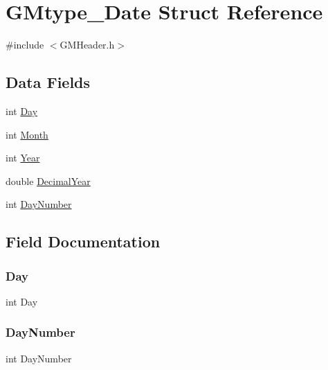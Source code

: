 \hypertarget{struct_g_mtype___date}{}\section{G\+Mtype\+\_\+\+Date Struct Reference}
\label{struct_g_mtype___date}


{\ttfamily \#include $<$G\+M\+Header.\+h$>$}

\subsection*{Data Fields}
\begin{DoxyCompactItemize}
\item 
int \mbox{\hyperlink{struct_g_mtype___date_a8f67164de537e3ec2b47e3204ddd3400}{Day}}
\item 
int \mbox{\hyperlink{struct_g_mtype___date_a530b376ec91a278ac98531d3ea17f148}{Month}}
\item 
int \mbox{\hyperlink{struct_g_mtype___date_a42e645110404fbf4f10235789577fa32}{Year}}
\item 
double \mbox{\hyperlink{struct_g_mtype___date_afb8201d541b7b916e28bdf9884f6c794}{Decimal\+Year}}
\item 
int \mbox{\hyperlink{struct_g_mtype___date_a5f6dc4b06442462a807a1069a8c82b6d}{Day\+Number}}
\end{DoxyCompactItemize}


\subsection{Field Documentation}
\mbox{\label{struct_g_mtype___date_a8f67164de537e3ec2b47e3204ddd3400}} 
\subsubsection{\texorpdfstring{Day}{Day}}
{\footnotesize\ttfamily int Day}

\mbox{\label{struct_g_mtype___date_a5f6dc4b06442462a807a1069a8c82b6d}} 
\subsubsection{\texorpdfstring{DayNumber}{DayNumber}}
{\footnotesize\ttfamily int Day\+Number}

